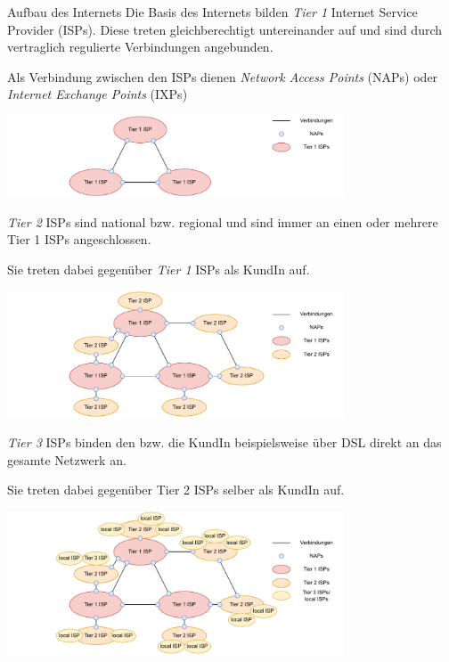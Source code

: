 \begin{bonus}{Aufbau des Internets}
    Die Basis des Internets bilden \emph{Tier 1} Internet Service Provider (ISPs).
    Diese treten gleichberechtigt untereinander auf und sind durch vertraglich regulierte Verbindungen angebunden.
    
    Als Verbindung zwischen den ISPs dienen \emph{Network Access Points} (NAPs) oder \emph{Internet Exchange Points} (IXPs)
    
    \begin{center}
        \includegraphics[width=0.75\textwidth]{includes/figures/bonus_aufbau_internet_1.pdf}
    \end{center}
    
    \emph{Tier 2} ISPs sind national bzw. regional und sind immer an einen oder mehrere Tier 1 ISPs angeschlossen.
    
    Sie treten dabei gegenüber \emph{Tier 1} ISPs als KundIn auf.
    
    \begin{center}
        \includegraphics[width=0.75\textwidth]{includes/figures/bonus_aufbau_internet_2.pdf}
    \end{center}
    
    \emph{Tier 3} ISPs binden den bzw. die KundIn beispielsweise über DSL direkt an das gesamte Netzwerk an.
    
    Sie treten dabei gegenüber Tier 2 ISPs selber als KundIn auf.
    
    \begin{center}
        \includegraphics[width=0.75\textwidth]{includes/figures/bonus_aufbau_internet_3.pdf}
    \end{center}
\end{bonus}

